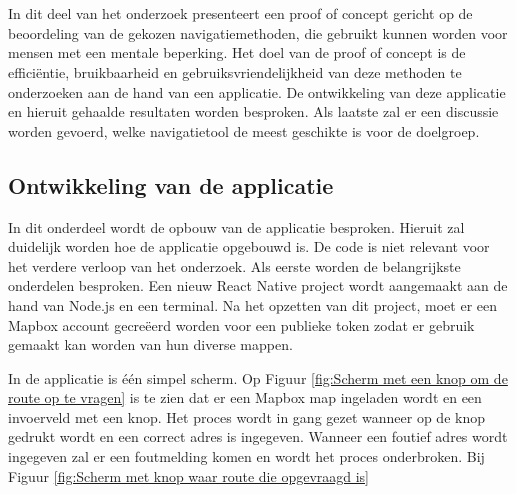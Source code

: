 
\chapter{}%
\label{ch:proof-of-concept}

In dit deel van het onderzoek presenteert een proof of concept gericht op de beoordeling van de gekozen navigatiemethoden, die gebruikt kunnen worden voor mensen met een mentale beperking. Het doel van de proof of concept is de efficiëntie, bruikbaarheid en gebruiksvriendelijkheid van deze methoden te onderzoeken aan de hand van een applicatie. De ontwikkeling van deze applicatie en hieruit gehaalde resultaten worden besproken. Als laatste zal er een discussie worden gevoerd, welke navigatietool de meest geschikte is voor de doelgroep.

\section{Ontwikkeling van de applicatie}
\label{sec:ontwikkeling van de applicatie}
In dit onderdeel wordt de opbouw van de applicatie besproken. Hieruit zal duidelijk worden hoe de applicatie opgebouwd is. De code is niet relevant voor het verdere verloop van het onderzoek. Als eerste worden de belangrijkste onderdelen besproken. Een nieuw React Native project wordt aangemaakt aan de hand van Node.js en een terminal. Na het opzetten van dit project, moet er een Mapbox account gecreëerd worden voor een publieke token zodat er gebruik gemaakt kan worden van hun diverse mappen. \newline

In de applicatie is één simpel scherm. Op Figuur \ref{fig:Scherm met een knop om de route op te vragen} is te zien dat er een Mapbox map ingeladen wordt en een invoerveld met een knop. Het proces wordt in gang gezet wanneer op de knop gedrukt wordt en een correct adres is ingegeven. Wanneer een foutief adres wordt ingegeven zal er een foutmelding komen en wordt het proces onderbroken. Bij Figuur \ref{fig:Scherm met knop waar route die opgevraagd is} 

